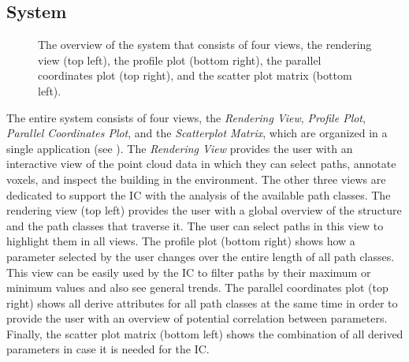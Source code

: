 \subsection{System} \label{contributions:usar:system}
\begin{figure}
\centering
{}
\caption{The overview of the system that consists of four views, the rendering view (top left), the profile plot (bottom right), the parallel coordinates plot (top right), and the scatter plot matrix (bottom left).}
\label{contributions:usar:system:system}
\end{figure}

The entire system consists of four views, the \emph{Rendering View}, \emph{Profile Plot}, \emph{Parallel Coordinates Plot}, and the \emph{Scatterplot Matrix}, which are organized in a single application (see ).  The \emph{Rendering View} provides the user with an interactive view of the point cloud data in which they can select paths, annotate voxels, and inspect the building in the  environment.  The other three views are dedicated to support the IC with the analysis of the available path classes.  The rendering view (top left) provides the user with a global overview of the structure and the path classes that traverse it.  The user can select paths in this view to highlight them in all views.  The profile plot (bottom right) shows how a parameter selected by the user changes over the entire length of all path classes.  This view can be easily used by the IC to filter paths by their maximum or minimum values and also see general trends.  The parallel coordinates plot (top right) shows all derive attributes for all path classes at the same time in order to provide the user with an overview of potential correlation between parameters.  Finally, the scatter plot matrix (bottom left) shows the combination of all derived parameters in case it is needed for the IC.


